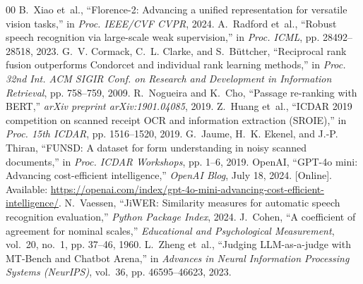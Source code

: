 \begin{thebibliography}{00}
B.~Xiao et~al., ``Florence-2: Advancing a unified representation for versatile vision tasks,'' in \emph{Proc. IEEE/CVF CVPR}, 2024.
A.~Radford et~al., ``Robust speech recognition via large-scale weak supervision,'' in \emph{Proc. ICML}, pp. 28492--28518, 2023.
G.~V. Cormack, C.~L. Clarke, and S.~B{\"u}ttcher, ``Reciprocal rank fusion outperforms Condorcet and individual rank learning methods,'' in \emph{Proc. 32nd Int. ACM SIGIR Conf. on Research and Development in Information Retrieval}, pp. 758--759, 2009.
R.~Nogueira and K.~Cho, ``Passage re-ranking with BERT,'' \emph{arXiv preprint arXiv:1901.04085}, 2019.
Z.~Huang et~al., ``ICDAR 2019 competition on scanned receipt OCR and information extraction (SROIE),'' in \emph{Proc. 15th ICDAR}, pp. 1516--1520, 2019.
G.~Jaume, H.~K. Ekenel, and J.-P. Thiran, ``FUNSD: A dataset for form understanding in noisy scanned documents,'' in \emph{Proc. ICDAR Workshops}, pp. 1--6, 2019.
OpenAI, ``GPT-4o mini: Advancing cost-efficient intelligence,'' \emph{OpenAI Blog}, July 18, 2024. [Online]. Available: \url{https://openai.com/index/gpt-4o-mini-advancing-cost-efficient-intelligence/}.
N.~Vaessen, ``JiWER: Similarity measures for automatic speech recognition evaluation,'' \emph{Python Package Index}, 2024.
J.~Cohen, ``A coefficient of agreement for nominal scales,'' \emph{Educational and Psychological Measurement}, vol.~20, no.~1, pp. 37--46, 1960.
L.~Zheng et~al., ``Judging LLM-as-a-judge with MT-Bench and Chatbot Arena,'' in \emph{Advances in Neural Information Processing Systems (NeurIPS)}, vol.~36, pp. 46595--46623, 2023.
\end{thebibliography}
